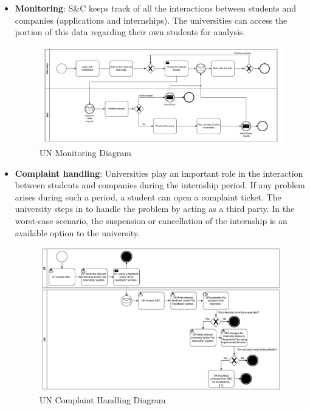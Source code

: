 \begin{itemize}
      \item \textbf{Monitoring}: S\&C keeps track of all the interactions between students and companies (applications
            and internships). The universities can access the portion of this data regarding their own students for
            analysis.

            \begin{figure}[H]
                  \centering
                  \includegraphics[width=1.0\textwidth]{Images/BPMN_14.pdf}
                  \caption{UN Monitoring Diagram}
                  \label{fig:un_monitoring_diagram}
            \end{figure}
      \item \textbf{Complaint handling}: Universities play an important role in the interaction between students and
            companies during the internship period. If any problem arises during such a period, a student can open a
            complaint ticket. The university steps in to handle the problem by acting as a third party. In the
            worst-case scenario, the suspension or cancellation of the internship is an available option to the
            university.

            \begin{figure}[H]
                  \centering
                  \includegraphics[width=1.0\textwidth]{Images/BPMN_15.pdf}
                  \caption{UN Complaint Handling Diagram}
                  \label{fig:un_complaint_handling_diagram}
            \end{figure}


\end{itemize}
